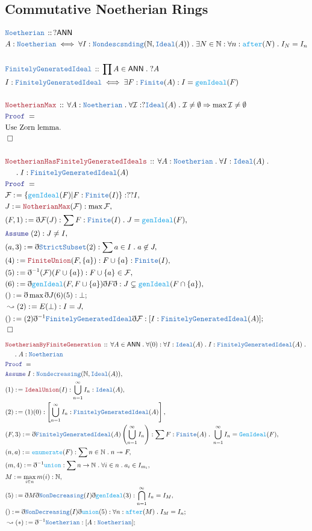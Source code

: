 \documentclass[12pt]{scrartcl}
\newcommand{\TYPE}[1]{\textcolor{NavyBlue}{\mathtt{#1}}}
\newcommand{\FUNC}[1]{\textcolor{Cerulean}{\mathtt{#1}}}
\newcommand{\LOGIC}[1]{\textcolor{Blue}{\mathtt{#1}}}
\newcommand{\THM}[1]{\textcolor{Maroon}{\mathtt{#1}}}
\renewcommand{\.}{\; . \;}
\newcommand{\de}{: \kern 0.1pc =}
\newcommand{\Theorem}[2]{& \THM{#1} \, :: \, #2 \\ & \Proof = \\ }
\newcommand{\DeclareType}[2]{& \TYPE{#1} \, :: \, #2 \\}
\newcommand{\DefineType}[3]{& #1 : \TYPE{#2} \iff #3 \\}
\newcommand{\NewLine}{\\ & \kern 1pc}
\newcommand{\Page}[1]{ \begin{align*} #1 \end{align*}   }
\newcommand{ \bd }{ \ByDef }
\newcommand{\Nat}{\mathbb{N} }
\newcommand{\ToSurj}{\twoheadrightarrow}
\newcommand{\Say}[3]{& #1 \de #2 : #3, \\}
\newcommand{\Conclude}[3]{& #1 \de #2 : #3; \\}
\newcommand{\Derive}[3]{& \leadsto #1 \de #2 : #3, \\}
\newcommand{\DeriveConclude}[3]{& \leadsto #1 \de #2 : #3 ; \\}
\newcommand{\Assume}[2]{& \LOGIC{Assume} \; #1 : #2, \\}
\newcommand{\QED}{\; \square}
\newcommand{\EndProof}{& \QED \\}
\newcommand{\ByDef}{\eth}
\newcommand{\Proof}{\LOGIC{Proof} \; }
\newcommand{\I}{\mathcal{I}}
\newcommand{\Ideal}{\TYPE{Ideal}}
\newcommand{\FGI}{\TYPE{FinitelyGeneratedIdeal}}
\newcommand{\ANN}{\mathsf{ANN}}
\newcommand{\F}{\mathcal{F}}
\begin{document}
\subsection{Commutative Noetherian Rings}
\Page{
	\DeclareType{Noetherian}{ ?\ANN    }
	\DefineType{A}{Noetherian}{  \forall I : \TYPE{Nondescsnding}(\Nat,\Ideal(A))  \. \exists N \in \Nat : \forall n : \FUNC{after}(N) \.  I_N = I_n  }
	\\
	\DeclareType{\FGI}{\prod A \in \ANN \. ?A}
	\DefineType{I}{\FGI}{\exists F : \TYPE{Finite}(A) : I = \FUNC{genIdeal}(F)}
	\\
	\Theorem{NoetherianMax}{ \forall A : \TYPE{Noetherian} \. \forall \I : ?\Ideal(A) \. \I \neq \emptyset \Rightarrow \max \I \neq \emptyset}
	&\text{Use Zorn lemma.}\\
	\EndProof
	\\
	\Theorem{NoetherianHasFinitelyGeneratedIdeals}{\forall  A : \TYPE{Noetherian}  \. \forall I : \Ideal(A) \.  \NewLine \.I : \FGI(A)}
	\Say{\F}{\{ \FUNC{genIdeal}(F) | F : \TYPE{Finite}(I)  \}}{??I}
	\Say{J}{\THM{NotherianMax}(\F)}{\max \F}
	\Say{(F,1)}{\bd \F (J)}{\sum F : \TYPE{Finite}(I) \. J = \FUNC{genIdeal}(F)}
	\Assume{(2)}{J \neq I}
	\Say{(a,3)}{\bd \TYPE{StrictSubset}(2)}{\sum a \in I \. a \not \in J}
	\Say{(4)}{\THM{FiniteUnion}(F,\{a\})}{ F \cup \{a\} : \TYPE{Finite}(I)}
	\Say{(5)}{\bd^{-1}(\F)(F \cup \{a\})}{ F \cup \{a\} \in \F   }
	\Say{(6)}{\bd \FUNC{genIdeal}(F,F \cup \{a\}) \bd F \bd }{  J \subsetneq \FUNC{genIdeal}(F \cap \{a\})}
	\Conclude{()}{\bd \max \bd J (6)(5)}{\bot}
	\Derive{(2)}{E(\bot)}{I = J}
	\Conclude{()}{(2)\bd^{-1}\FGI\bd \F}{[I : \FGI(A)]}
	\EndProof 
}\Page{
	\Theorem{NoetherianByFiniteGeneration}{\forall A \in \ANN \. \forall (0) : \forall I : \Ideal(A) \. I : \FGI(A) \.  \NewLine \. A : \TYPE{Noetherian}  }
	\Assume{I}{\TYPE{Nondecreasing}(\Nat,\Ideal(A))}
	\Say{(1)}{\THM{IdealUnion}(I)}{\bigcup^\infty_{n=1} I_n : \Ideal(A)}
	\Say{(2)}{(1)(0)}{ \left[ \bigcup^\infty_{n=1} I_n  : \FGI(A) \right]   }
	\Say{(F,3)}{\bd \FGI(A)\left(\bigcup^\infty_{n=1} I_n \right) }{\sum F : \TYPE{Finite}(A) \. \bigcup^\infty_{n=1} I_n = \FUNC{GenIdeal}(F)}
	\Say{(n,a)}{\FUNC{enumerate}(F)}{\sum n \in \Nat \. n \ToSurj F}
	\Say{(m,4)}{\bd^{-1} \FUNC{union} }{ \sum n \to \Nat \. \forall i \in n \. a_i \in I_{m_i}  }
	\Say{M}{ \max_{i \in n } m(i)  }{ \Nat  }
	\Say{(5)}{\bd M \bd \TYPE{NonDecreasing}(I) \bd \FUNC{genIdeal}(3)}{  \bigcap^\infty_{n=1} I_n = I_M  }
	\Conclude{()}{ \bd \TYPE{NonDecreasing}(I) \bd\FUNC{union}(5)}{\forall n : \FUNC{after}(M) \. I_M = I_n }
	\DeriveConclude{(*)}{\bd^{-1}\TYPE{Noetherian}}{[A : \TYPE{Noetherian}]}
}
\end{document}
